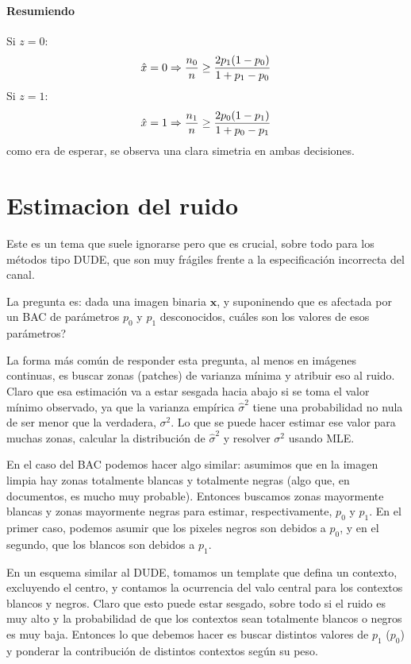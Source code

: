 \documentclass{article}
\begin{document}
\paragraph{Resumiendo}
Si $z=0$:
$$\hat{x}=0 \Rightarrow \frac{n_0}{n} \geq \frac{2p_1(1-p_0)}{1 + p_1 - p_0}$$
Si $z=1$:
$$
\hat{x}=1 \Rightarrow \frac{n_1}{n} \geq \frac{2p_0(1-p_1)}{1 + p_0-p_1}
$$
como era de esperar, se observa una clara simetria en ambas decisiones.



\section{Estimacion del ruido}

Este es un tema que suele ignorarse pero que es crucial, sobre todo para los métodos tipo DUDE, que son muy frágiles frente a la especificación incorrecta del canal.
\def\vx{\ensuremath{\mathbf{x}}}

La pregunta es: dada una imagen binaria $\vx$, y suponinendo que es afectada por un BAC de parámetros $p_0$ y $p_1$ desconocidos, cuáles son los valores de esos parámetros?

La forma más común de responder esta pregunta, al menos en imágenes continuas, es buscar zonas (patches) de varianza mínima y atribuir eso al ruido. Claro que esa estimación va a estar sesgada hacia abajo si se toma el valor mínimo observado, ya que la varianza empírica $\hat\sigma^2$ tiene una probabilidad no nula de ser menor que la verdadera, $\sigma^2$. Lo que se puede hacer estimar ese valor para muchas zonas, calcular la distribución de $\hat\sigma^2$ y resolver $\sigma^2$ usando MLE.

En el caso del BAC podemos hacer algo similar: asumimos que en la imagen limpia hay zonas totalmente blancas y totalmente negras (algo que, en documentos, es mucho muy probable).
Entonces buscamos zonas mayormente blancas y zonas mayormente negras para estimar, respectivamente, $p_0$ y $p_1$. En el primer caso, podemos asumir que los pixeles negros son debidos a $p_0$, y en el segundo, que los blancos son debidos a $p_1$.

En un esquema similar al DUDE, tomamos un template que defina un contexto, excluyendo el centro, y contamos la ocurrencia del valo central para los contextos blancos y negros. Claro que esto puede estar sesgado, sobre todo si el ruido es muy alto y la probabilidad de que los contextos sean totalmente blancos o negros es muy baja. Entonces lo que debemos hacer es buscar distintos valores de $p_1$ ($p_0$) y ponderar la contribución de distintos contextos según su peso.
\end{document}
